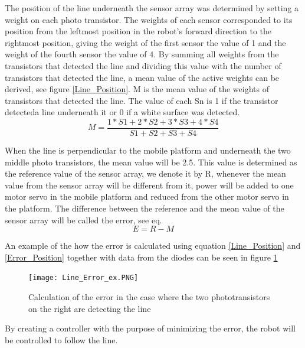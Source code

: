 The position of the line underneath the sensor array was determined by setting a weight on each photo transistor. The weights of each sensor corresponded to its position from the leftmost position in the robot's forward direction to the rightmost position, giving the weight of the first sensor the value of 1 and the weight of the fourth sensor the value of 4. By summing all weights from the transistors that detected the line and dividing this value with the number of transistors that detected the line, a mean value of the active weights can be derived, see figure \ref{Line_Position}. M is the mean value of the weights of transistors that detected the line. The value of each Sn is 1 if the transistor detecteda line underneath it or 0 if a white surface was detected.
\begin{equation}
    M=\frac{1*S1+2*S2+3*S3+4*S4}{S1+S2+S3+S4}
    \label{Line_Position} 
\end{equation}

When the line is perpendicular to the mobile platform and underneath the two middle photo transistors, the mean value will be 2.5. This value is determined as the reference value of the sensor array, we denote it by R, whenever the mean value from the sensor array will be different from it, power will be added to one motor servo in the mobile platform and reduced from the other motor servo in the platform. The difference between the reference and the mean value of the sensor array will be called the error, see eq.
\begin{equation}
    E=R-M
    \label{Error_Position} 
\end{equation}

An example of the how the error is calculated using equation \ref{Line_Position} and \ref{Error_Position} together with data from the diodes can be seen in figure \ref{Line_Error_ex}

\begin{figure}[H]
    \centering
    \texttt{[image: Line\_Error\_ex.PNG]}
    \caption{Calculation of the error in the case where the two phototransistors on the right are detecting the line}
    \label{Line_Error_ex}
\end{figure}


By creating a controller with the purpose of minimizing the error, the robot will be controlled to follow the line.

